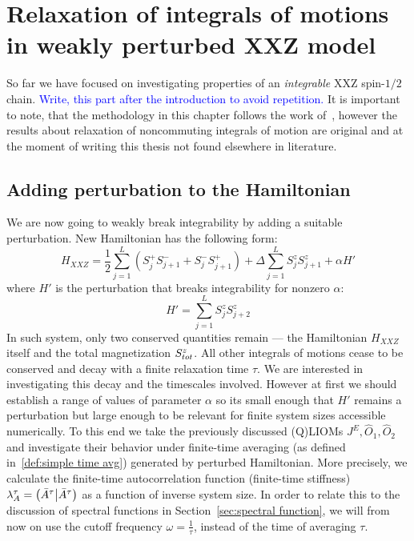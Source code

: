 \chapter{Relaxation of integrals of motions in weakly perturbed XXZ model}
\thispagestyle{chapterBeginStyle}

So far we have focused on investigating properties of an \textit{integrable} XXZ
spin-\(1/2\) chain.
\textcolor{blue}{Write, this part after the introduction to avoid repetition.}
It is important to note, that the methodology in this chapter follows the work
of~\textcite{Mierzejewski2015Approx}, however the results about relaxation of noncommuting integrals
of motion are original and at the moment of writing this thesis not found elsewhere
in literature. 

\section{Adding perturbation to the Hamiltonian}
We are now going to weakly break integrability by adding a suitable perturbation.
New Hamiltonian has the following form:
\begin{equation}
    H_{XXZ} = \frac{1}{2}\sum_{j = 1}^{L}\left( S^{+}_{j} S^{-}_{j+1} + 
    S^{-}_{j}S^{+}_{j+1} \right) + \Delta\sum_{j = 1}^{L} S^{z}_{j}S^{z}_{j+1}
    + \alpha H'
    \label{eq:HXXZ perturbed}
\end{equation}
where \(H'\) is the perturbation that breaks integrability for nonzero \(\alpha \):
\begin{equation}
    H'=\sum_{j = 1}^{L} S^{z}_{j}S^{z}_{j+2}
    \label{eq:perturbation}
\end{equation}
In such system, only two conserved quantities remain --- the Hamiltonian \(H_{XXZ}\) itself 
and the total magnetization \(S^{z}_{tot}\). All other integrals of motions cease to be conserved
and decay with a finite relaxation time \(\tau\). We are interested in investigating this
decay and the timescales involved. However at first we should establish a range of
values of parameter \(\alpha\) so its small enough that \(H'\) remains a perturbation
but large enough to be relevant for finite system sizes accessible numerically. 
To this end we take the previously discussed (Q)LIOMs  \(J^E, \hat{O}_1,\hat{O}_2\)
and investigate their behavior under finite-time averaging (as defined in~\eqref{def:simple time avg})
generated by perturbed Hamiltonian. More precisely, we calculate the finite-time autocorrelation
function (finite-time stiffness) \(\lambda^{\tau}_A = \left(\bar{A}^{\tau} \middle| \bar{A}^{\tau}\right)\) as
a function of inverse system size.
In order to relate this to the discussion of spectral functions in Section~\ref{sec:spectral function},
we will from now on use the cutoff frequency \(\omega = \frac{1}{\tau}\), instead of the time of
averaging \(\tau\). 

